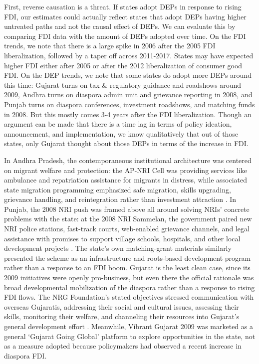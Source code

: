 \documentclass[12pt]{article}
\begin{document}
First, reverse causation is a threat. If states adopt DEPs in response to rising FDI, our estimates could actually reflect states that adopt DEPs having higher untreated paths and not the causal effect of DEPs. 
We can evaluate this by comparing FDI data with the amount of DEPs adopted over time. On the FDI trends, we note that there is a large spike in 2006 after the 2005 FDI liberalization, followed by a taper off across 2011-2017. States may have expected higher FDI either after 2005 or after the 2012 liberalization of consumer good FDI.  On the DEP trends, we note that some states do adopt more DEPs around this time: Gujarat turns on tax \& regulatory guidance and roadshows around 2009, Andhra turns on diaspora admin unit and grievance reporting in 2008, and Punjab turns on diaspora conferences, investment roadshows, and matching funds in 2008. But this mostly comes 3-4 years after the FDI liberalization. Though an argument can be made that there is a time lag in terms of policy ideation, announcement, and implementation, we know qualitatively that out of those states, only Gujarat thought about those DEPs in terms of the increase in FDI. 

In Andhra Pradesh, the contemporaneous institutional architecture was centered on migrant welfare and protection: the AP-NRI Cell was providing services like ambulance and repatriation assistance for migrants in distress, while associated state migration programming emphasized safe migration, skills upgrading, grievance handling, and reintegration rather than investment attraction \citep{society_andhra_nodate}. In Punjab, the 2008 NRI push was framed above all around solving NRIs’ concrete problems with the state: at the 2008 NRI Sammelan, the government paired new NRI police stations, fast-track courts, web-enabled grievance channels, and legal assistance with promises to support village schools, hospitals, and other local development projects \citep{noauthor_nri_nodate, noauthor_nine_2013}. The state’s own matching-grant materials similarly presented the scheme as an infrastructure and roots-based development program rather than a response to an FDI boom. Gujarat is the least clean case, since its 2009 initiatives were openly pro-business, but even there the official rationale was broad developmental mobilization of the diaspora rather than a response to rising FDI flows. The NRG Foundation’s stated objectives stressed communication with overseas Gujaratis, addressing their social and cultural issues, assessing their skills, monitoring their welfare, and channeling their resources into Gujarat’s general development effort \citep{noauthor_home_nodate}. Meanwhile, Vibrant Gujarat 2009 was marketed as a general ‘Gujarat Going Global’ platform to explore opportunities in the state, not as a measure adopted because policymakers had observed a recent increase in diaspora FDI.
\end{document}
